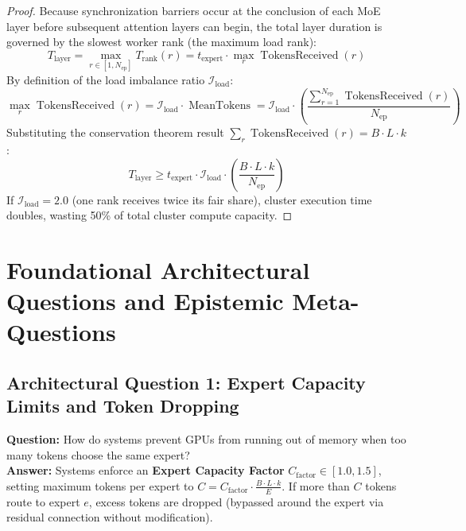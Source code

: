 \documentclass[11pt,a4paper]{article}
\theoremstyle{definition}
\begin{document}
\begin{proof}
Because synchronization barriers occur at the conclusion of each MoE layer before subsequent attention layers can begin, the total layer duration is governed by the slowest worker rank (the maximum load rank):
{\boldmath
\begin{equation}
T_{\text{layer}} = \max_{r \in [1, N_{\text{ep}}]} T_{\text{rank}}(r) = t_{\text{expert}} \cdot \max_r \operatorname{TokensReceived}(r)
\end{equation}
}
By definition of the load imbalance ratio $\mathcal{I}_{\text{load}}$:
{\boldmath
\begin{equation}
\max_r \operatorname{TokensReceived}(r) = \mathcal{I}_{\text{load}} \cdot \operatorname{MeanTokens} = \mathcal{I}_{\text{load}} \cdot \left( \frac{\sum_{r=1}^{N_{\text{ep}}} \operatorname{TokensReceived}(r)}{N_{\text{ep}}} \right)
\end{equation}
}
Substituting the conservation theorem result $\sum_r \operatorname{TokensReceived}(r) = B \cdot L \cdot k$:
{\boldmath
\begin{equation}
T_{\text{layer}} \ge t_{\text{expert}} \cdot \mathcal{I}_{\text{load}} \cdot \left( \frac{B \cdot L \cdot k}{N_{\text{ep}}} \right)
\end{equation}
}
If $\mathcal{I}_{\text{load}} = 2.0$ (one rank receives twice its fair share), cluster execution time doubles, wasting 50\% of total cluster compute capacity.
\end{proof}

\section{Foundational Architectural Questions and Epistemic Meta-Questions}

\subsection{Architectural Question 1: Expert Capacity Limits and Token Dropping}
\textbf{Question:} How do systems prevent GPUs from running out of memory when too many tokens choose the same expert?\\
\textbf{Answer:} Systems enforce an \textbf{Expert Capacity Factor} $C_{\text{factor}} \in [1.0, 1.5]$, setting maximum tokens per expert to $C = C_{\text{factor}} \cdot \frac{B \cdot L \cdot k}{E}$. If more than $C$ tokens route to expert $e$, excess tokens are dropped (bypassed around the expert via residual connection without modification).
\end{document}
